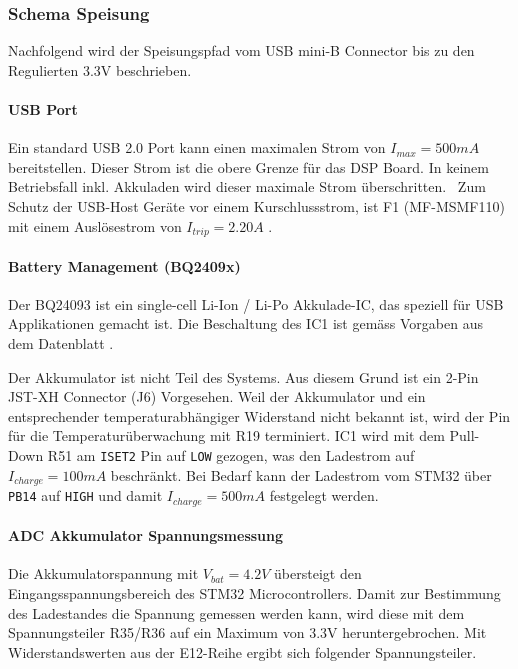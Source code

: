 \subsubsection{Schema Speisung}
\label{sec:Schema_Speisung}

Nachfolgend wird der Speisungspfad vom USB mini-B Connector bis zu den Regulierten 3.3\si{V} beschrieben.

\paragraph{USB Port}

Ein standard USB 2.0 Port kann einen maximalen Strom von ${I_{max}=500\si{mA}}$ bereitstellen.
Dieser Strom ist die obere Grenze für das DSP Board. In keinem Betriebsfall inkl. Akkuladen wird dieser maximale Strom überschritten.
\
Zum Schutz der USB-Host Geräte vor einem Kurschlussstrom, ist F1 (MF-MSMF110) mit einem Auslösestrom von ${I_{trip}=2.20\si{A}}$ \cite{usb-fuse}.


\paragraph{Battery Management (BQ2409x)}

Der BQ24093 ist ein single-cell Li-Ion / Li-Po Akkulade-IC, das speziell für USB Applikationen gemacht ist.
Die Beschaltung des IC1 ist gemäss Vorgaben aus dem Datenblatt \cite{bq2409x}.

Der Akkumulator ist nicht Teil des Systems. Aus diesem Grund ist ein 2-Pin JST-XH Connector (J6) Vorgesehen.
Weil der Akkumulator und ein entsprechender temperaturabhängiger Widerstand nicht bekannt ist, 
wird der Pin für die Temperaturüberwachung mit R19 terminiert.
IC1 wird mit dem Pull-Down R51 am \texttt{ISET2} Pin auf \texttt{LOW} gezogen, was den Ladestrom auf ${I_{charge}=100\si{mA}}$ beschränkt. 
Bei Bedarf kann der Ladestrom vom STM32 über \texttt{PB14} auf \texttt{HIGH} und damit ${I_{charge}=500\si{mA}}$ festgelegt werden.



\paragraph{ADC Akkumulator Spannungsmessung}

Die Akkumulatorspannung mit ${V_{bat}=4.2\si{V}}$ übersteigt den Eingangsspannungsbereich des STM32 Microcontrollers.
Damit zur Bestimmung des Ladestandes die Spannung gemessen werden kann, wird diese mit dem Spannungsteiler R35/R36 auf ein Maximum von 3.3\si{V} heruntergebrochen. 
Mit Widerstandswerten aus der E12-Reihe ergibt sich folgender Spannungsteiler.

